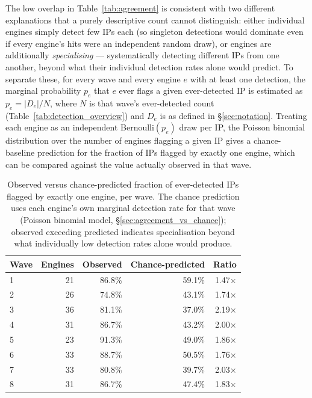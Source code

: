 \documentclass[12pt, a4paper, twoside]{report}
\begin{document}
The low overlap in Table~\ref{tab:agreement} is consistent with two different explanations that a
purely descriptive count cannot distinguish: either individual engines simply detect few IPs each
(so singleton detections would dominate even if every engine's hits were an independent random
draw), or engines are additionally \emph{specialising} --- systematically detecting different IPs
from one another, beyond what their individual detection rates alone would predict. To separate
these, for every wave and every engine $e$ with at least one detection, the marginal probability
$p_e$ that $e$ ever flags a given ever-detected IP is estimated as $p_e = |D_e| / N$, where $N$ is
that wave's ever-detected count (Table~\ref{tab:detection_overview}) and $D_e$ is as defined in
\S\ref{sec:notation}. Treating each engine as an independent Bernoulli$(p_e)$ draw per IP, the
Poisson binomial distribution over the number of engines flagging a given IP gives a
chance-baseline prediction for the fraction of IPs flagged by exactly one engine, which can be
compared against the value actually observed in that wave.

\begin{table}[h]
  \centering
  \caption{Observed versus chance-predicted fraction of ever-detected IPs flagged by exactly one
    engine, per wave. The chance prediction uses each engine's own marginal detection rate for that
    wave (Poisson binomial model, \S\ref{sec:agreement_vs_chance}); observed exceeding predicted
    indicates specialisation beyond what individually low detection rates alone would produce.}
  \label{tab:agreement_chance}
  \begin{tabular}{lrrrr}
    \toprule
    \textbf{Wave} & \textbf{Engines} & \textbf{Observed} & \textbf{Chance-predicted} & \textbf{Ratio} \\
    \midrule
    1 & 21 & 86.8\% & 59.1\% & 1.47$\times$ \\
    2 & 26 & 74.8\% & 43.1\% & 1.74$\times$ \\
    3 & 36 & 81.1\% & 37.0\% & 2.19$\times$ \\
    4 & 31 & 86.7\% & 43.2\% & 2.00$\times$ \\
    5 & 23 & 91.3\% & 49.0\% & 1.86$\times$ \\
    6 & 33 & 88.7\% & 50.5\% & 1.76$\times$ \\
    7 & 33 & 80.8\% & 39.7\% & 2.03$\times$ \\
    8 & 31 & 86.7\% & 47.4\% & 1.83$\times$ \\
    \bottomrule
  \end{tabular}
\end{table}
\end{document}

